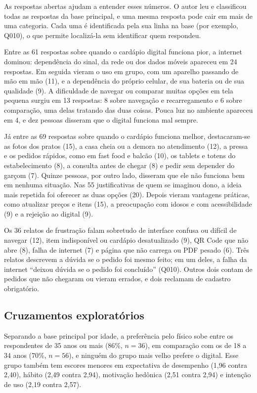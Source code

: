 As respostas abertas ajudam a entender esses números. O autor leu e classificou todas as respostas da base principal, e uma mesma resposta pode cair em mais de uma categoria. Cada uma é identificada pela sua linha na base (por exemplo, Q010), o que permite localizá-la sem identificar quem respondeu.

Entre as 61 respostas sobre quando o cardápio digital funciona pior, a internet dominou: dependência do sinal, da rede ou dos dados móveis apareceu em 24 respostas. Em seguida vieram o uso em grupo, com um aparelho passando de mão em mão (11), e a dependência do próprio celular, de sua bateria ou de sua qualidade (9). A dificuldade de navegar ou comparar muitas opções em tela pequena surgiu em 13 respostas: 8 sobre navegação e recarregamento e 6 sobre comparação, uma delas tratando das duas coisas. Pouca luz no ambiente apareceu em 4, e dez pessoas disseram que o digital funciona mal sempre.

Já entre as 69 respostas sobre quando o cardápio funciona melhor, destacaram-se as fotos dos pratos (15), a casa cheia ou a demora no atendimento (12), a pressa e os pedidos rápidos, como em fast food e balcão (10), os tablets e totens do estabelecimento (8), a consulta antes de chegar (8) e pedir sem depender do garçom (7). Quinze pessoas, por outro lado, disseram que ele não funciona bem em nenhuma situação. Nas 55 justificativas de quem se imaginou dono, a ideia mais repetida foi oferecer as duas opções (20). Depois vieram vantagens práticas, como atualizar preços e itens (15), a preocupação com idosos e com acessibilidade (9) e a rejeição ao digital (9).

Os 36 relatos de frustração falam sobretudo de interface confusa ou difícil de navegar (12), item indisponível ou cardápio desatualizado (9), QR Code que não abre (8), falha de internet (7) e página que não carrega ou PDF pesado (6). Três relatos descrevem a dúvida se o pedido foi mesmo feito; em um deles, a falha da internet ``deixou dúvida se o pedido foi concluído'' (Q010). Outros dois contam de pedidos que não chegaram ou vieram errados, e dois reclamam de cadastro obrigatório.

\subsection{Cruzamentos exploratórios}
\label{sec:res-cruzamentos}

Separando a base principal por idade, a preferência pelo físico sobe entre os respondentes de 35 anos ou mais (86\%, $n = 36$), em comparação com os de 18 a 34 anos (70\%, $n = 56$), e ninguém do grupo mais velho prefere o digital. Esse grupo também tem escores menores em expectativa de desempenho (1,96 contra 2,40), hábito (2,49 contra 2,94), motivação hedônica (2,51 contra 2,94) e intenção de uso (2,19 contra 2,57).

